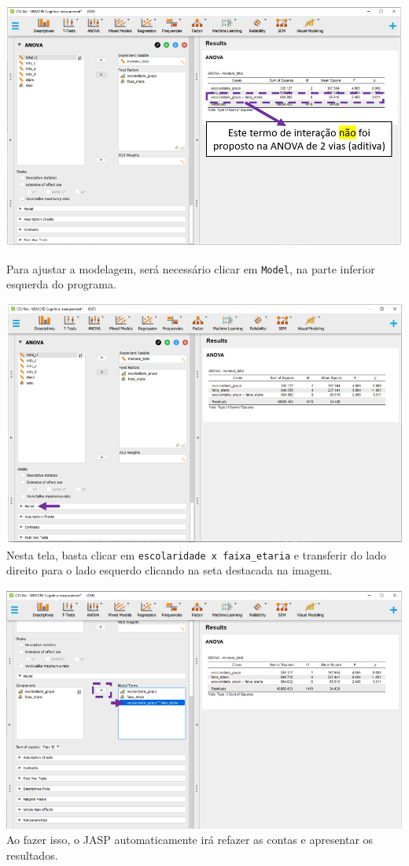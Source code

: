 \documentclass[
]{book}
\begin{document}
\includegraphics{./img/cap_anova_two_way_execucao.png}

Para ajustar a modelagem, será necessário clicar em \texttt{Model}, na parte inferior esquerda do programa.

\includegraphics{./img/cap_anova_two_way_model_interface.png}
Nesta tela, basta clicar em \texttt{escolaridade\ x\ faixa\_etaria} e transferir do lado direito para o lado esquerdo clicando na seta destacada na imagem.

\includegraphics{./img/cap_anova_two_way_model2.png}
Ao fazer isso, o JASP automaticamente irá refazer as contas e apresentar os resultados.
\end{document}

